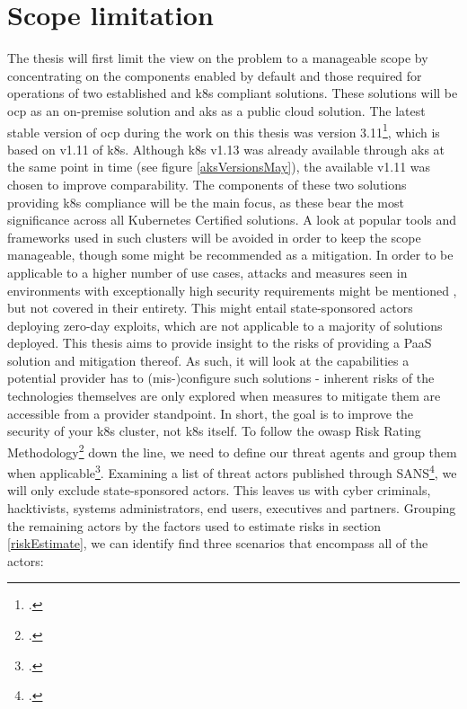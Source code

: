 \section{Scope limitation} \label{scopeLimit}

The thesis will first limit the view on the problem to a manageable scope by concentrating on the components enabled by default and those required for operations of two established and \gls{k8s} compliant solutions.
These solutions will be \gls{ocp} as an on-premise solution and \gls{aks} as a public cloud solution. 
The latest stable version of \gls{ocp} during the work on this thesis was version 3.11\footcite{ocpRelease}, which is based on v1.11 of \gls{k8s}.
Although \gls{k8s} v1.13 was already available through \gls{aks} at the same point in time (see figure \ref{aksVersionsMay}), the available v1.11 was chosen to improve comparability.
The components of these two solutions providing \gls{k8s} compliance will be the main focus, as these bear the most significance across all Kubernetes Certified solutions. 
A look at popular tools and frameworks used in such clusters will be avoided in order to keep the scope manageable, though some might be recommended as a mitigation.
In order to be applicable to a higher number of use cases, attacks and measures seen in environments with exceptionally high security requirements might be mentioned , but not  covered in their entirety. This might entail state-sponsored actors deploying zero-day exploits, which are not applicable to a majority of solutions deployed.
This thesis aims to provide insight to the risks of providing a PaaS solution and mitigation thereof. 
As such, it will look at the capabilities a potential provider has to (mis-)configure such solutions - inherent risks of the technologies themselves are only explored when measures to mitigate them are accessible from a provider standpoint. 
In short, the goal is to improve the security of your \gls{k8s} cluster, not \gls{k8s} itself.
To follow the \gls{owasp} Risk Rating Methodology\footcite{riskRating} down the line, we need to define our threat agents and group them when applicable\footcite[][, Section 'Define all possible threats']{threatModeling}. Examining a list of threat actors published through SANS\footcite[][p. 12 to 17]{sansThreatActors}, we will only exclude state-sponsored actors. This leaves us with cyber criminals, hacktivists, systems administrators, end users, executives and partners.
Grouping the remaining actors by the factors used to estimate risks in section \ref{riskEstimate}, we can identify find three scenarios that encompass all of the actors:
